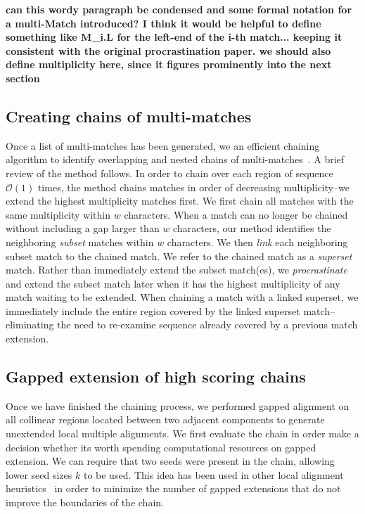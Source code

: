 \documentclass{ws-procs9x6}
\begin{document}
\textbf{can this wordy paragraph be condensed and some formal notation for a multi-Match introduced? I think it would be helpful to define something like M\_i.L for the left-end of the i-th match...  keeping it consistent with the original
procrastination paper.  we should also define multiplicity here, since it figures prominently into the next section}

\subsection{Creating chains of multi-matches}

Once a list of multi-matches has been generated, we an efficient chaining algorithm to identify overlapping and nested chains of multi-matches~\cite{ref-procrast}. A brief review of the method follows. In order to chain over each region of sequence $\mathcal{O}(1)$ times,
the method chains matches in order of decreasing multiplicity--we
extend the highest multiplicity matches first. We first chain all matches
with the same multiplicity within $w$
characters. When a match can no
longer be chained without including a gap larger than $w$
characters, our method identifies the neighboring \textit{subset}
matches within $w$ characters. We then \textit{link} each
neighboring subset match to the chained match. We refer to the
chained match as a \textit{superset} match. Rather than immediately
extend the subset match(es), we \textit{procrastinate} and extend
the subset match later when it has the highest multiplicity of any
match waiting to be extended. When chaining a match with a linked
superset, we immediately include the entire region covered by the linked superset
match--eliminating the need to re-examine sequence already covered by
a previous match extension.

\subsection{Gapped extension of high scoring chains}

Once we have finished the chaining process, we performed gapped alignment on all collinear regions located between two adjacent components to generate unextended local multiple alignments. We first evaluate the chain in order make a decision whether its worth spending computational resources on gapped extension. We can require that two seeds were present in the chain, allowing lower seed sizes $k$ to be used. This idea has been used in other local alignment heuristics~\cite{ref-blastz,ref-gappedblast,ref-blat} in order to minimize the number of gapped extensions that do not improve the boundaries of the chain.
\end{document}
